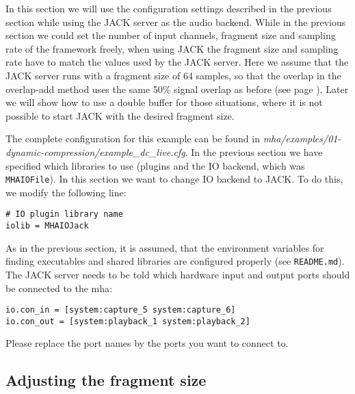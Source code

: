 In this section we will use the configuration settings described in the previous section 
while using the JACK server as the audio backend. While in the previous section
we could  set the number of 
input channels, fragment size and sampling rate of the framework freely,
when using JACK the fragment size
and sampling rate have to match the values used by the JACK server.
%
Here we assume that the JACK server runs with a fragment size
of 64 samples, so that the overlap in the overlap-add method uses the same
50\% signal overlap as before (see page \pageref{overlapexplanation}).
%
Later we will show how to use a double buffer for those
situations, where it is not possible to start JACK with the desired
fragment size. 

The complete configuration for this example can be found in \emph{mha/examples/01-dynamic-compression/example\_dc\_live.cfg}.  In the previous section we have specified which libraries to use 
(plugins and the IO backend, which was \verb!MHAIOFile!). In this section 
we want to change IO backend to JACK. 
%
To do this, we modify the following line:
\begin{verbatim}
# IO plugin library name
iolib = MHAIOJack
\end{verbatim}
%
As in the previous section, it is assumed, that the environment
variables for finding executables and shared libraries are configured
properly (see \verb!README.md!).
%
The JACK server needs to be told which hardware input and output ports should be
connected to the mha:
\begin{verbatim}
io.con_in = [system:capture_5 system:capture_6]
io.con_out = [system:playback_1 system:playback_2]
\end{verbatim}
Please replace the port names by the ports you want to connect
to.
%
\subsection{Adjusting the fragment size}%
%
%

